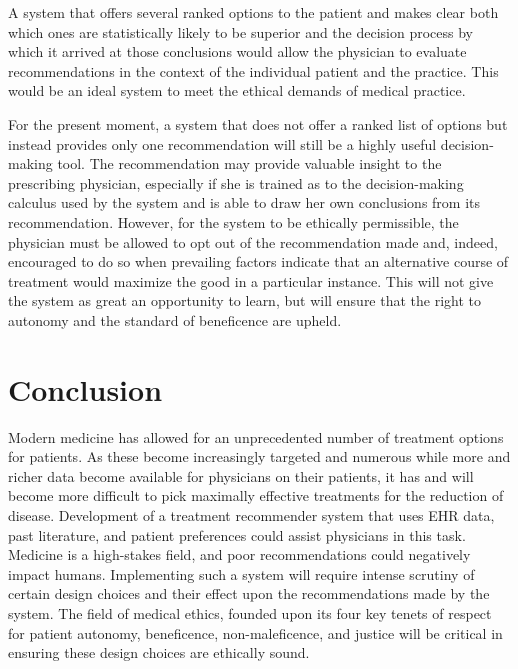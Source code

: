 \documentclass[]{spie}  %
\begin{document}
A system that offers several ranked options to the patient and makes clear both which ones are statistically likely to be superior and the decision process by which it arrived at those conclusions would allow the physician to evaluate recommendations in the context of the individual patient and the practice. This would be an ideal system to meet the ethical demands of medical practice.

For the present moment, a system that does not offer a ranked list of options but instead provides only one recommendation will still be a highly useful decision-making tool. The recommendation may provide valuable insight to the prescribing physician, especially if she is trained as to the decision-making calculus used by the system and is able to draw her own conclusions from its recommendation. However, for the system to be ethically permissible, the physician must be allowed to opt out of the recommendation made and, indeed, encouraged to do so when prevailing factors indicate that an alternative course of treatment would maximize the good in a particular instance. This will not give the system as great an opportunity to learn, but will ensure that the right to autonomy and the standard of beneficence are upheld.


\section{Conclusion}

Modern medicine has allowed for an unprecedented number of treatment options for patients. As these become increasingly targeted and numerous while more and richer data become available for physicians on their patients, it has and will become more difficult to pick maximally effective treatments for the reduction of disease. Development of a treatment recommender system that uses EHR data, past literature, and patient preferences could assist physicians in this task. Medicine is a high-stakes field, and poor recommendations could negatively impact humans. Implementing such a system will require intense scrutiny of certain design choices and their effect upon the recommendations made by the system. The field of medical ethics, founded upon its four key tenets of respect for patient autonomy, beneficence, non-maleficence, and justice will be critical in ensuring these design choices are ethically sound.
\end{document}
